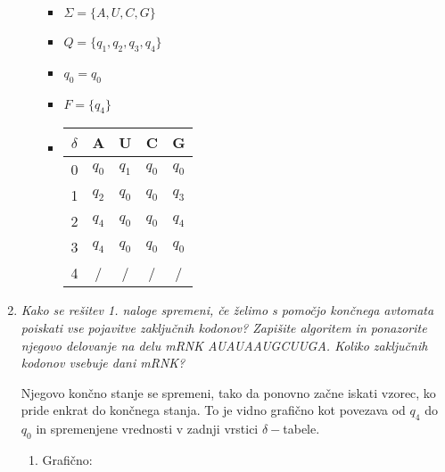 \documentclass{article}
\begin{document}
\begin{enumerate}
\begin{enumerate}
				\begin{itemize}
					\item $\Sigma = \{ A, U, C, G \}$
					\item $Q = \{ q_1, q_2, q_3, q_4 \}$
					\item $q_0 = q_0$
					\item $F = \{ q_4 \}$
					\item \begin{tabular}{|c||c|c|c|c|}
							\hline
							$\delta$ & A & U & C & G \\
							\hline \hline
							0 & $q_0$ & $q_1$ & $q_0$ & $q_0$\\
							\hline
							1 & $q_2$ & $q_0$ & $q_0$ & $q_3$\\
							\hline
							2 & $q_4$ & $q_0$ & $q_0$ & $q_4$\\
							\hline
							3 & $q_4$ & $q_0$ & $q_0$ & $q_0$\\
							\hline
							4 & / & / & / & / \\
							\hline
						\end{tabular}
				\end{itemize}
		\end{enumerate}

		\newpage

	\item \textit{Kako se rešitev 1. naloge spremeni, če želimo s pomočjo končnega
			avtomata poiskati vse pojavitve zaključnih kodonov? Zapišite algoritem
			in ponazorite njegovo delovanje na delu mRNK AUAUAAUGCUUGA. Koliko
		zaključnih kodonov vsebuje dani mRNK?}

		Njegovo končno stanje se spremeni, tako da ponovno začne iskati vzorec, ko
		pride enkrat do
		končnega stanja. To je vidno grafično kot povezava od $q_4$ do $q_0$ in
		spremenjene vrednosti v zadnji vrstici $\delta-$tabele.

		\begin{enumerate}
			\item Grafično:



\end{enumerate}
\end{enumerate}
\end{document}
